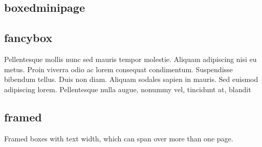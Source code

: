 \subsection{boxedminipage}

%

\begin{filecontents*}{\democodefile}
  \vspace{0.5\baselineskip}\newline
{}
  \vspace{0.5\baselineskip}\newline
{}
\end{filecontents*}

\subsection{fancybox}

%
%
\begin{filecontents*}{\democodefile}
\begin{framed}
Pellentesque mollis nunc sed mauris tempor molestie.
Aliquam adipiscing nisi eu metus. Proin viverra odio ac
lorem consequat condimentum. Suspendisse bibendum tellus.
Duis non diam. Aliquam sodales sapien in mauris. Sed
euismod adipiscing lorem. Pellentesque nulla augue, 
nonummy vel, tincidunt at, blandit 
\end{framed}
\end{filecontents*}

\subsection{framed}

Framed boxes with text width, which can span over more than one page.

